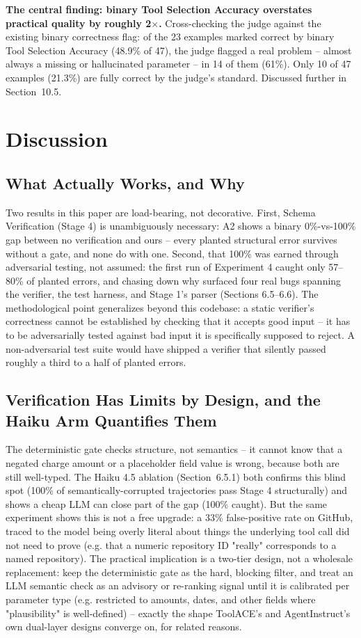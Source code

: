 \documentclass[11pt]{article}
\begin{document}
\textbf{The central finding: binary Tool Selection Accuracy overstates practical quality by
roughly 2$\times$.} Cross-checking the judge against the existing binary correctness flag: of the
23 examples marked correct by binary Tool Selection Accuracy (48.9\% of 47), the judge flagged a
real problem -- almost always a missing or hallucinated parameter -- in 14 of them (61\%). Only
10 of 47 examples (21.3\%) are fully correct by the judge's standard. Discussed further in
Section~10.5.

\section{Discussion}

\subsection{What Actually Works, and Why}
Two results in this paper are load-bearing, not decorative. First, Schema Verification (Stage 4)
is unambiguously necessary: A2 shows a binary 0\%-vs-100\% gap between no verification and ours --
every planted structural error survives without a gate, and none do with one. Second, that 100\%
was earned through adversarial testing, not assumed: the first run of Experiment 4 caught only
57--80\% of planted errors, and chasing down why surfaced four real bugs spanning the verifier, the
test harness, and Stage 1's parser (Sections 6.5--6.6). The methodological point generalizes beyond
this codebase: a static verifier's correctness cannot be established by checking that it accepts
good input -- it has to be adversarially tested against bad input it is specifically supposed to
reject. A non-adversarial test suite would have shipped a verifier that silently passed roughly a
third to a half of planted errors.

\subsection{Verification Has Limits by Design, and the Haiku Arm Quantifies Them}
The deterministic gate checks structure, not semantics -- it cannot know that a negated charge
amount or a placeholder field value is wrong, because both are still well-typed. The Haiku 4.5
ablation (Section~6.5.1) both confirms this blind spot (100\% of semantically-corrupted
trajectories pass Stage 4 structurally) and shows a cheap LLM can close part of the gap (100\%
caught). But the same experiment shows this is not a free upgrade: a 33\% false-positive rate on
GitHub, traced to the model being overly literal about things the underlying tool call did not
need to prove (e.g. that a numeric repository ID "really" corresponds to a named repository).
The practical implication is a two-tier design, not a wholesale replacement: keep the deterministic
gate as the hard, blocking filter, and treat an LLM semantic check as an advisory or re-ranking
signal until it is calibrated per parameter type (e.g. restricted to amounts, dates, and other
fields where "plausibility" is well-defined) -- exactly the shape ToolACE's and AgentInstruct's
own dual-layer designs converge on, for related reasons.
\end{document}

